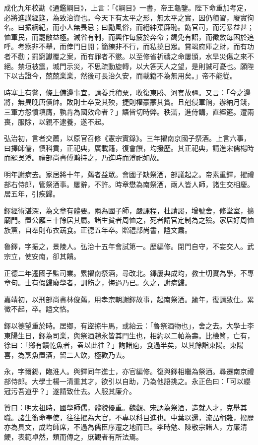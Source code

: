 \begin{pinyinscope}
成化九年校勘《通鑑綱目》，上言：「《綱目》一書，帝王龜鑒。陛下命重加考定，必將進講經筵，為致治資也。今天下有太平之形，無太平之實，因仍積習，廢實徇名。曰振綱紀，而小人無畏忌；曰勵風俗，而縉紳棄廉恥。飭官司，而污暴益甚；恤軍民，而罷敝益極。減省有制，而興作每疲於奔命；蠲免有詔，而徵斂每困於追呼。考察非不舉，而倖門日開；簡練非不行，而私撓日眾。賞竭府庫之財，而有功者不勸；罰窮讞覆之案，而有罪者不懲。以至修省祈禱之命屢頒，水旱災傷之來不絕。禁垣被震，城門示災，不思疏動旋轉，以大答天人之望，是則誠可憂也。願陛下以古證今，兢兢業業，然後可長治久安，而載籍不為無用矣。」帝不能從。

時塞上有警，條上備邊事宜，請養兵積粟，收復東勝、河套故疆。又言：「今之邊將，無異晚唐債帥。敗則士卒受其殃，捷則權豪蒙其賞。且剋侵軍餉，辦納月錢，三軍方怨憤填膺，孰肯為國效命者？」語皆切時弊。秩滿，進侍講，直經筵。遭兩喪，服除，以親不逮養，遂不起。

弘治初，言者交薦，以原官召修《憲宗實錄》。三年擢南京國子祭酒。上言六事，曰擇師儒，慎科貢，正祀典，廣載籍，復會饌，均撥歷。其正祀典，請進宋儒楊時而罷吳澄。禮部尚書傅瀚持之，乃進時而澄祀如故。

明年謝病去。家居將十年，薦者益眾。會國子缺祭酒，部議起之。帝素重鐸，擢禮部右侍郎，管祭酒事。屢辭，不許。時章懋為南祭酒，兩人皆人師，諸生交相慶。居五年，引疾歸。

鐸經術湛深，為文章有體要。兩為國子師，嚴課程，杜請謁，增號舍，修堂室，擴廟門。置公廨三十餘居其屬。諸生貧者周恤之，死者請官定制為之殮。家居好周恤族黨，自奉則布衣蔬食。正德五年卒。贈禮部尚書，謚文肅。

魯鐸，字振之，景陵人。弘治十五年會試第一。歷編修。閉門自守，不妄交人。武宗立，使安南，卻其饋。

正德二年遷國子監司業。累擢南祭酒，尋改北。鐸屢典成均，教士切實為學，不專章句。士有假歸廢學者，訓飭之，悔過乃已。久之，謝病歸。

嘉靖初，以刑部尚書林俊薦，用孝宗朝謝鐸故事，起南祭酒。踰年，復請致仕。累徵不起，卒。謚文恪。

鐸以德望重於時。居鄉，有盜掠牛馬，或紿云：「魯祭酒物也」，舍之去。大學士李東陽生日，鐸為司業，與祭酒趙永皆其門生也，相約以二帕為壽。比檢笥，亡有，徐曰：「鄉有饋乾魚者，盍以此往？」詢諸庖，食過半矣，以其餘詣東陽。東陽喜，為烹魚置酒，留二人飲，極歡乃去。

永，字爾錫，臨淮人。與鐸同年進士，亦官編修。復與鐸相繼為祭酒。尋遷南京禮部侍郎。大學士楊一清重其才，欲引以自助，乃為他語挑之。永正色曰：「可以纓冠污吾道乎？」遂請致仕去。人服其廉介。

贊曰：明太祖時，國學師儒，體貌優重。魏觀、宋訥為祭酒，造就人才，克舉其職。諸生銜命奉使，往往擢為大官，不專以科目進也。中葉以還，流品稍雜，撥歷亦為具文，成均師席，不過為儒臣序遷之地而已。李時勉、陳敬宗諸人，方廉清鯁，表範卓然，類而傳之，庶觀者有所法焉。


\end{pinyinscope}